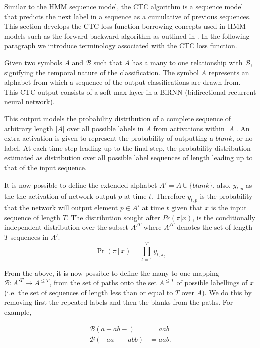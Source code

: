 Similar to the HMM sequence model, the CTC algorithm is a sequence model that predicts the next label in a sequence as a cumulative of previous sequences.  This section develops the CTC loss function borrowing concepts used in HMM models such as the forward backward algorithm as outlined in \citep{graves2006connectionist}.  In the following paragraph we introduce terminology associated with the CTC loss function.

Given two symbols $A$ and $\mathcal{B}$ such that $A$ has a many to one relationship with $\mathcal{B}$, signifying the temporal nature of the classification. The symbol $A$ represents an alphabet from which a sequence of the output classifications are drawn from. This CTC output consists of a soft-max layer in a BiRNN (bidirectional recurrent neural network). 

This output models the probability distribution of a complete sequence of arbitrary length $|A|$ over all possible labels in $A$ from activations within $|A|$. An extra activation is given to represent the probability of outputting a $blank$, or no label. At each time-step leading up to the final step, the probability distribution estimated as distribution over all possible label sequences of length leading up to that of the input sequence.

It is now possible to define the extended alphabet $A' = A \cup \{blank\}$, also, $y_{t,p}$ as the the activation of network output $p$ at time $t$.  Therefore $y_{t,p}$  is the probability that the network will output element $p \in A'$ at time $t$ given that $x$ is the input sequence of length $T$.  The distribution sought after $Pr(\pi|x)$, is the conditionally independent distribution over the subset $A'^T$ where $A'^T$ denotes the set of length $T$ sequences in $A'$. 
\begin{equation}
\Pr( \pi \, | \, x ) = \prod_{t=1}^{T} y_{t,\pi_t}
\label{eqn_c3_ctc01}\end{equation}

From the above, it is now possible to define the many-to-one mapping $\mathcal{B} : A'^T \rightarrow A^{\le T}$, from the set of paths onto the set $A^{\le T}$ of possible labellings of $x$ (i.e. the set of sequences of length less than or equal to $T$ over $A$). We do this by removing first the repeated labels and then the blanks from the paths. For example,

\begin{equation}\begin{aligned}\mathcal{B}(a - ab-) &= aab \\ \mathcal{B}(-aa - -abb) &= aab.\end{aligned} \label{eqn_c3_ctc02}
\end{equation}

